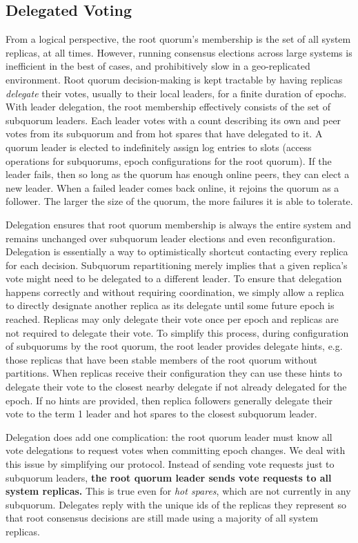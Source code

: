 \documentclass[sigplan,screen,review,anonymous,nonacm]{acmart}
\begin{document}
\subsection{Delegated Voting}
From a logical perspective, the root quorum's membership is the set of 
all system replicas, at all times.
However, running consensus elections across large systems is inefficient 
in the best of cases, and prohibitively slow in a geo-replicated 
environment.
Root quorum decision-making is kept tractable by having replicas 
\emph{delegate} their votes, usually to their local leaders, for a finite 
duration of epochs.
With leader delegation, the root membership effectively consists of the 
set of subquorum leaders.
Each leader votes with a count describing its own and peer votes from its
subquorum and from hot spares that have delegated to it.
A quorum leader is elected to indefinitely assign log entries to slots 
(access operations for subquorums, epoch configurations for the root 
quorum).
If the leader fails, then so long as the quorum has enough online peers, 
they can elect a new leader.
When a failed leader comes back online, it rejoins the quorum as a 
follower.
The larger the size of the quorum, the more failures it is able to 
tolerate.

Delegation ensures that root quorum membership is always the entire 
system and remains unchanged over subquorum leader elections and even 
reconfiguration.
Delegation is essentially a way to optimistically shortcut contacting 
every replica for each decision.
Subquorum repartitioning merely implies that a given replica's vote 
might need to be delegated to a different leader.
To ensure that delegation happens correctly and without requiring 
coordination, we simply allow a replica to directly designate another 
replica as its delegate until some future epoch is reached.
Replicas may only delegate their vote once per epoch and replicas are 
not required to delegate their vote.
To simplify this process, during configuration of subquorums by the 
root quorum, the root leader provides delegate hints, e.g. those 
replicas that have been stable members of the root quorum without 
partitions.
When replicas receive their configuration they can use these hints 
to delegate their vote to the closest nearby delegate if not already 
delegated for the epoch.
If no hints are provided, then replica followers generally delegate 
their vote to the term 1 leader and hot spares to the closest subquorum 
leader.

Delegation does add one complication: the root quorum leader must 
know all vote delegations to request votes when committing epoch 
changes.
We deal with this issue by simplifying our protocol.
Instead of sending vote requests just to subquorum leaders, 
\textbf{the root quorum leader sends vote requests to all system 
replicas.}
This is true even for \emph{hot spares}, which are not currently 
in any subquorum.
Delegates reply with the unique ids of the replicas they represent 
so that root consensus decisions are still made using a majority of 
all system replicas.
\end{document}
